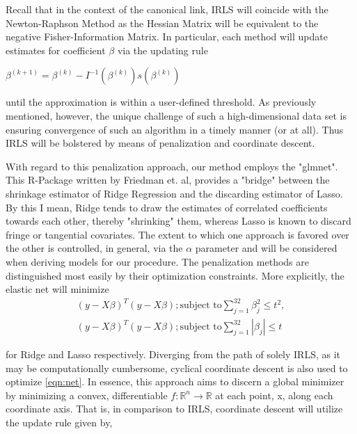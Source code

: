 \documentclass[11pt]{article}
\begin{document}
  	Recall that in the context of the canonical link, IRLS will coincide with the Newton-Raphson Method as the Hessian Matrix will be equivalent to the negative Fisher-Information Matrix.  In particular, each method will update estimates for coefficient $\beta$ via the updating rule 
	
\begin{center}
$\beta^{(k+1)}=\beta^{(k)}-I^{-1}(\beta^{(k)})s(\beta^{(k)})$
\end{center}

 until the approximation is within a user-defined threshold.  As previously mentioned, however, the unique challenge of such a high-dimensional data set is ensuring convergence of such an algorithm in a timely manner (or at all).  Thus IRLS will be bolstered by means of penalization and coordinate descent.  
 	
	With regard to this penalization approach, our method employs the "glmnet".  This R-Package written by Friedman et. al, provides a "bridge" between the shrinkage estimator of Ridge Regression and the discarding estimator of Lasso.  By this I mean, Ridge tends to draw the estimates of correlated coefficients towards each other, thereby "shrinking" them, whereas Lasso is known to discard fringe or tangential covariates.  The extent to which one approach is favored over the other is controlled, in general, via the $\alpha$ parameter and will be considered when deriving models for our procedure.   The penalization methods are distinguished most easily by their optimization constraints.  More explicitly, the elastic net will minimize
	\begin{equation}
	\begin{aligned}
\label{eqn:net}
(y-X\beta)^T(y-X\beta); \text{subject to} \sum_{j=1}^{32} \beta_j^2 \le t^2 ,\\
(y-X\beta)^T(y-X\beta); \text{subject to} \sum_{j=1}^{32} |\beta_j| \le t
\end{aligned}
\end{equation}  

 for Ridge and Lasso respectively.   Diverging from the path of solely IRLS, as it may be computationally cumbersome, cyclical coordinate descent is also used to optimize \eqref{eqn:net}.   In essence, this approach aims to discern a global minimizer by minimizing a convex, differentiable $f:\mathbb{R}^n \rightarrow \mathbb{R}$ at each point, x, along each coordinate axis.  That is, in comparison to IRLS, coordinate descent will utilize the update rule given by, 
 
\end{document}
